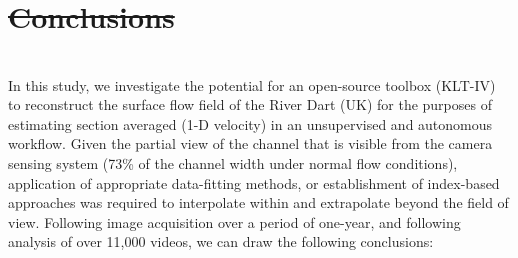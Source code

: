 \documentclass[hess, manuscript]{copernicus} %
\providecommand{\DIFadd}[1]{{\protect\color{blue}\uwave{#1}}} %
\providecommand{\DIFdel}[1]{{\protect\color{red}\sout{#1}}} %
\providecommand{\DIFaddbegin}{} %
\providecommand{\DIFaddend}{} %
\providecommand{\DIFdelbegin}{} %
\providecommand{\DIFdelend}{} %
\newcommand{\DIFscaledelfig}{0.5}
\newlength{\DIFdelgraphicswidth} %
\newlength{\DIFdelgraphicsheight} %
\newcommand{\DIFaddincludegraphics}[2][]{{\color{blue}\fbox{\DIFOincludegraphics[#1]{#2}}}} %
\newcommand{\DIFdelincludegraphics}[2][]{%
\sbox{\DIFdelgraphicsbox}{\DIFOincludegraphics[#1]{#2}}%
\settoboxwidth{\DIFdelgraphicswidth}{\DIFdelgraphicsbox} %
\settoboxtotalheight{\DIFdelgraphicsheight}{\DIFdelgraphicsbox} %
\scalebox{\DIFscaledelfig}{%
\parbox[b]{\DIFdelgraphicswidth}{\usebox{\DIFdelgraphicsbox}\\[-\baselineskip] \rule{\DIFdelgraphicswidth}{0em}}\llap{\resizebox{\DIFdelgraphicswidth}{\DIFdelgraphicsheight}{%
\setlength{\unitlength}{\DIFdelgraphicswidth}%
\begin{picture}(1,1)%
\thicklines\linethickness{2pt} %
{\color[rgb]{1,0,0}\put(0,0){\framebox(1,1){}}}%
{\color[rgb]{1,0,0}\put(0,0){\line( 1,1){1}}}%
{\color[rgb]{1,0,0}\put(0,1){\line(1,-1){1}}}%
\end{picture}%
}\hspace*{3pt}}} %
} %
\DeclareRobustCommand{\DIFaddbegin}{\DIFOaddbegin \let\includegraphics\DIFaddincludegraphics} %
\DeclareRobustCommand{\DIFaddend}{\DIFOaddend \let\includegraphics\DIFOincludegraphics} %
\DeclareRobustCommand{\DIFdelbegin}{\DIFOdelbegin \let\includegraphics\DIFdelincludegraphics} %
\DeclareRobustCommand{\DIFdelend}{\DIFOaddend \let\includegraphics\DIFOincludegraphics} %
\begin{document}
\DIFdelbegin \section{\DIFdel{Conclusions}}
\addtocounter{section}{-1}%
\DIFdelend \DIFaddbegin \section*{\DIFadd{Conclusions}}
\DIFaddend In this study, we investigate the potential for an open-source toolbox (KLT-IV) to reconstruct the surface flow field of the River Dart (UK) for the purposes of estimating section averaged (1-D velocity) in an unsupervised and autonomous workflow. Given the partial view of the channel that is visible from the camera sensing system (73\% of the channel width under normal flow conditions), application of appropriate data-fitting methods, or establishment of index-based approaches was required to interpolate within and extrapolate beyond the field of view. Following image acquisition over a period of one-year, and following analysis of over 11,000 videos, we can draw the following conclusions:
\end{document}
